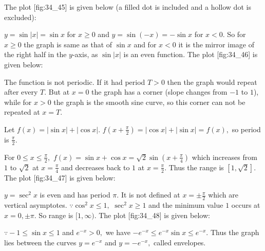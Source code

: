   The plot [fig:34_45] is given below (a filled dot is included and a hollow dot is excluded):

  \startplacefigure[title={Plot of $[\sin x]$}, reference=fig:34_45]
    \externalfigure[34_45.pdf]
  \stopplacefigure

\item $y = \sin|x| = \sin x$ for $x\geq 0$ and $y = \sin(-x) = -\sin x$ for $x < 0.$ So for $x\geq 0$ the graph is
  same as that of $\sin x$ and for $x < 0$ it is the mirror image of the right half in the $y$-axis, as $\sin|x|$ is an
  even function. The plot [fig:34_46] is given below:

  \startplacefigure[title={Plot of $\sin|x|$}, reference=fig:34_46]
    \externalfigure[34_46.pdf]
  \stopplacefigure

  The function is not periodic. If it had period $T > 0$ then the graph would repeat after every $T.$ But at $x = 0$
  the graph has a corner (slope changes from $-1$ to $1$), while for $x > 0$ the graph is the smooth sine curve, so this
  corner can not be repeated at $x = T.$

\item Let $f(x) = |\sin x| + |\cos x|.$ $f\left(x + \frac{\pi}{2}\right) = |\cos x| + |\sin x| = f(x),$ so period is
  $\frac{\pi}{2}.$

  For $0\leq x\leq\frac{\pi}{2},$ $f(x) = \sin x + \cos x = \sqrt{2}\sin\left(x + \frac{\pi}{4}\right)$ which
  increases from $1$ to $\sqrt{2}$ at $x = \frac{\pi}{4}$ and decreases back to $1$ at $x = \frac{\pi}{2}.$ Thus the
  range is $[1, \sqrt{2}].$ The plot [fig:34_47] is given below:

  \startplacefigure[title={Plot of $|\sin x| + |\cos x|$}, reference=fig:34_47]
    \externalfigure[34_47.pdf]
  \stopplacefigure

\item $y = \sec^2x$ is even and has period $\pi.$ It is not defined at $x = \pm\frac{\pi}{2}$ which are vertical
  asymptotes. $\because\cos^2x\leq 1,$ $\sec^2x\geq 1$ and the minimum value $1$ occurs at $x = 0, \pm\pi.$ So
  range is $[1, \infty).$ The plot [fig:34_48] is given below:

  \startplacefigure[title={Plot of $\sec^2x$}, reference=fig:34_48]
    \externalfigure[34_48.pdf]
  \stopplacefigure

\item $\because -1\leq\sin x\leq 1$ and $e^{-x} > 0,$ we have $-e^{-x}\leq e^{-x}\sin x\leq e^{-x}.$ Thus the graph
  lies between the curves $y = e^{-x}$ and $y = -e^{-x},$ called envelopes.

